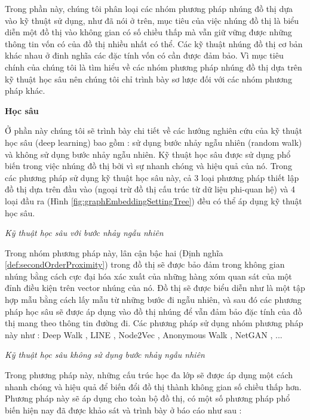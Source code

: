Trong phần này, chúng tôi phân loại các nhóm phương pháp nhúng đồ thị dựa vào kỹ thuật sử dụng, như đã nói ở trên, mục tiêu của việc nhúng đồ thị là biểu diễn một đồ thị vào không gian có số chiều thấp mà vẫn giữ vững được những thông tin vốn có của đồ thị nhiều nhất có thể. Các kỹ thuật nhúng đồ thị cơ bản khác nhau ở đinh nghĩa các đặc tính vốn có cần được đảm bảo. Vì mục tiêu chính của chúng tôi là tìm hiểu về các nhóm phương pháp nhúng đồ thị dựa trên kỹ thuật học sâu nên chúng tôi chỉ trình bày sơ lược đối với các nhóm phương pháp khác.

\textbf{Học sâu}

Ở phần này chúng tôi sẽ trình bày chi tiết về các hướng nghiên cứu của kỹ thuật học sâu (deep learning) bao gồm : sử dụng bước nhảy ngẫu nhiên (random walk) và không sử dụng bước nhảy ngẫu nhiên. Kỹ thuật học sâu được sử dụng phổ biến trong việc nhúng đồ thị bởi vì sự nhanh chóng và hiệu quả của nó. Trong các phương pháp sử dụng kỹ thuật học sâu này, cả 3 loại phương pháp thiết lập đồ thị dựa trên đầu vào (ngoại trừ đồ thị cấu trúc từ dữ liệu phi-quan hệ) và 4 loại đầu ra (Hình \ref{fig:graphEmbeddingSettingTree}) đều có thể áp dụng kỹ thuật học sâu. 

\textit{Kỹ thuật học sâu với bước nhảy ngẫu nhiên}

Trong nhóm phương pháp này, lân cận bậc hai (Định nghĩa \ref{def:secondOrderProximity}) trong đồ thị sẽ được bảo đảm trong không gian nhúng bằng cách cực đại hóa xác xuất của những hàng xóm quan sát của một đỉnh điều kiện trên vector nhúng của nó. Đồ thị sẽ được biểu diễn như là một tập hợp mẫu bằng cách lấy mẫu từ những bước đi ngẫu nhiên, và sau đó các phương pháp học sâu sẽ được áp dụng vào đồ thị nhúng để vẫn đảm bảo đặc tính của đồ thị mang theo thông tin đường đi. Các phương pháp sử dụng nhóm phương pháp này như : Deep Walk \cite{perozzi2014deepwalk}, LINE \cite{tang2015line}, Node2Vec \cite{grover2016node2vec}, Anonymous Walk \cite{ivanov2018anonymous}, NetGAN \cite{bojchevski2018netgan}, ...

\textit{Kỹ thuật học sâu không sử dụng bước nhảy ngẫu nhiên}

Trong phương pháp này, những cấu trúc học đa lớp sẽ được áp dụng một cách nhanh chóng và hiệu quả để biến đổi đồ thị thành không gian số chiều thấp hơn. Phương pháp này sẽ áp dụng cho toàn bộ đồ thị, có một số phương pháp phổ biến hiện nay đã được khảo sát và trình bày ở báo cáo \cite{rossi2020knowledge} như sau :

